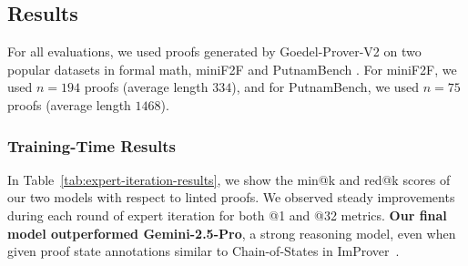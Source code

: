 \subsection{Results}
\label{sec:experiments}

For all evaluations, we used proofs generated by Goedel-Prover-V2 \citep{lin2025goedel} on two popular datasets in formal math, miniF2F \citep{zheng2021minif2f} and PutnamBench \citep{tsoukalas2024putnambench}. For miniF2F, we used $n=194$ proofs (average length $334$), and for PutnamBench, we used $n=75$ proofs (average length $1468$).

\subsubsection{Training-Time Results}
In Table~\ref{tab:expert-iteration-results}, we show the min@k and red@k scores of our two models with respect to linted proofs.
We observed steady improvements during each round of expert iteration for both @1 and @32 metrics. \textbf{Our final model outperformed Gemini-2.5-Pro}, a strong reasoning model, even when given proof state annotations similar to Chain-of-States in ImProver~\citep{ahuja2024improver}.


